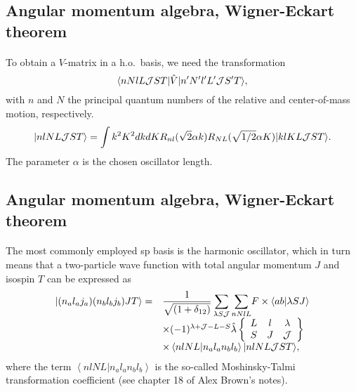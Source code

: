\documentclass[%
twoside,                 %
final,                   %
10pt]{article}
\begin{document}
\subsection*{Angular momentum algebra, Wigner-Eckart theorem}

\paragraph{}
To obtain a $V$-matrix in a h.o.~basis, we need  
the transformation
\[
     \langle nNlL{\cal J}ST\vert\hat{V}\vert n'N'l'L'{\cal J}S'T\rangle,
\]
with $n$ and $N$ the principal quantum numbers of the relative and
center-of-mass motion, respectively.
\[
   \vert nlNL{\cal J}ST\rangle= \int k^{2}K^{2}dkdKR_{nl}(\sqrt{2}\alpha k)
R_{NL}(\sqrt{1/2}\alpha K)
\vert klKL{\cal J}ST\rangle.
\]
The parameter $\alpha$ is the chosen oscillator length.



\subsection*{Angular momentum algebra, Wigner-Eckart theorem}

\paragraph{}
The most commonly employed sp basis is the harmonic oscillator, which
in turn means that
a two-particle wave function with total angular momentum $J$
and isospin $T$
can be expressed as 
\[
\begin{array}{ll}
\vert (n_{a}l_{a}j_{a})(n_{b}l_{b}j_{b})JT\rangle =&
{\displaystyle
\frac{1}{\sqrt{(1+\delta_{12})}}
\sum_{\lambda S{\cal J}}\sum_{nNlL}}
F\times \langle ab|\lambda SJ \rangle\\
&\times (-1)^{\lambda +{\cal J}-L-S}\hat{\lambda}
\left\{\begin{array}{ccc}L&l&\lambda\\S&J&{\cal J}
\end{array}\right\}\\
&\times \left\langle nlNL| n_al_an_bl_b\right\rangle
\vert nlNL{\cal J}ST\rangle ,\end{array}
\label{eq:hoho}
\]
where the term
$\left\langle nlNL| n_al_an_bl_b\right\rangle$
is the so-called Moshinsky-Talmi transformation coefficient (see chapter 18 of Alex Brown's notes).
\end{document}

